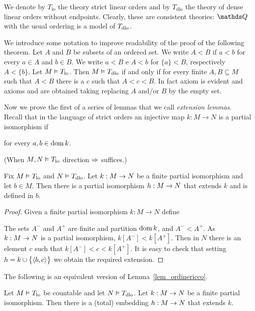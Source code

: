 \documentclass[creche.tex]{subfiles}
\begin{document}
We denote by \emph{$T_{\textrm{lo}}$} the theory strict linear orders and by \emph{$T_{\textrm{dlo}}$} the theory of dense linear orders without endpoints. Clearly, these are consistent theories: $\QQ$ with the usual ordering is a model of $T_{\rm dlo}$.

We introduce some notation to improve readability of the proof of the following theorem. Let $A$ and $B$ be subsets of an ordered set. We write $A<B$ if $a<b$ for every $a\in A$ and $b\in B$. We write $a<B$ e $A<b$ for $\{a\}<B$, respectively $A<\{b\}$. Let $M\models T_{\rm lo}$. Then $M\models T_{\rm dlo}$ if and only if for every finite $A, B\subseteq M$ such that $A<B$ there is a $c$ such that  $A<c<B$.  In fact axiom  is evident and axioms  and  are obtained taking replacing $A$ and/or $B$ by the empty set.

Now we prove the first of a series of lemmas that we call \emph{extension lemmas}. Recall that in the language of strict orders an injective map $k:M\to N$ is a partial isomorphism if 

\hfill for every $a,b\in\dom k$.

(When $M,N\models T_{\rm lo}$ direction $\IMP$ suffices.)

\begin{lemma}\label{lem_ordinericco}
Fix $M\models T_{\rm lo}$ and $N\models T_{\rm dlo}$. Let $k:M\imp N$ be a finite partial isomorphism and let $b\in M$. Then there is a partial isomorphism $h:M\imp N$ that extends $k$ and is defined in $b$.
\end{lemma}

\begin{proof}
Given a finite partial isomorphism $k:M\to N$ define



The sets $A^-$ and $A^+$ are finite and partition $\dom k$, and  $A^-<A^+$. As $k:M\imp N$ is a partial isomorphism, $k[A^-]<k[A^+]$. Then in $N$ there is an element $c$ such that $k[A^-]<c<k[A^+]$. It is easy to check that setting $h=k\cup\big\{\<b,c\>\big\}$ we obtain the required extension.
\end{proof}

The following is an equivalent version of Lemma~\ref{lem_ordinericco}.

\begin{corollary}\label{coroll_ordinericco}
Let $M\models T_{\rm lo}$ be countable and let $N\models T_{\rm dlo}$. Let $k:M\imp N$ be a finite partial isomorphism. Then there is a (total) embedding $h:M\imp N$ that extends $k$.
\end{corollary}
\end{document}
